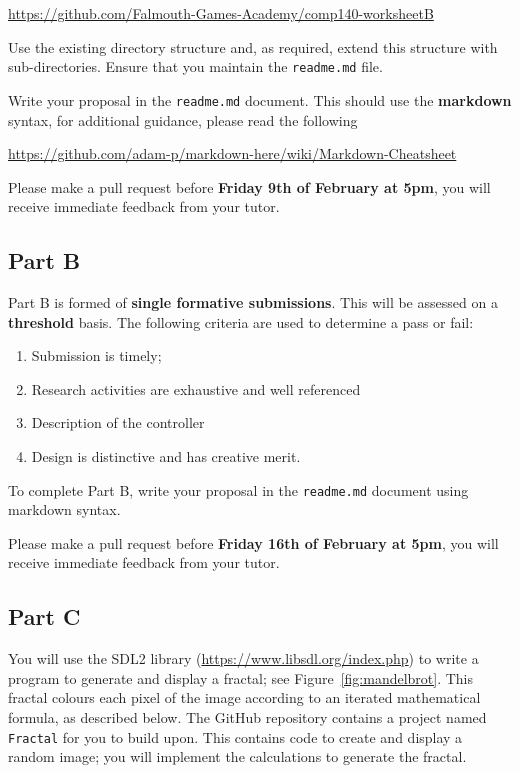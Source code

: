 \documentclass{../../../fal_assignment}
\begin{document}
\indent \url{https://github.com/Falmouth-Games-Academy/comp140-worksheetB}

Use the existing directory structure and, as required, extend this structure with sub-directories. Ensure that you maintain the \texttt{readme.md} file.

Write your proposal in the \texttt{readme.md} document. This should use the \textbf{markdown} syntax, for additional guidance, please read the following  

\indent \url{https://github.com/adam-p/markdown-here/wiki/Markdown-Cheatsheet}

Please make a pull request before \textbf{Friday 9th of February at 5pm}, you will receive immediate feedback from your tutor. 

\subsection*{Part B}

Part B is formed of \textbf{single formative submissions}. This will be assessed on a \textbf{threshold} basis. The following criteria are used to determine a pass or fail:

\begin{enumerate}[label=(\alph*)]
	\item Submission is timely;
	\item Research activities are exhaustive and well referenced
	\item Description of the controller 
	\item Design is distinctive and has creative merit.
\end{enumerate}

To complete Part B, write your proposal in the \texttt{readme.md} document using markdown syntax.

Please make a pull request before \textbf{Friday 16th of February at 5pm}, you will receive immediate feedback from your tutor. 

\subsection*{Part C}

You will use the SDL2 library (\url{https://www.libsdl.org/index.php}) to write a program to generate and display a fractal; see Figure~\ref{fig:mandelbrot}.
This fractal colours each pixel of the image according to an iterated mathematical formula, as described below.
The GitHub repository contains a project named \texttt{Fractal} for you to build upon.
This contains code to create and display a random image; you will implement the calculations to generate the fractal.
\end{document}
